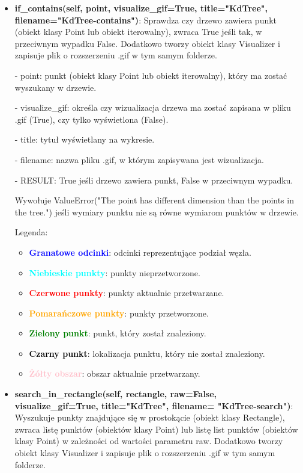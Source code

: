 \documentclass{lab}
\begin{document}
\begin{itemize}
  \item \textbf{if\_contains(self, point, visualize\_gif=True, title="KdTree", filename="KdTree-contains")}:
  Sprawdza czy drzewo zawiera punkt (obiekt klasy Point lub obiekt iterowalny), zwraca True jeśli tak, w przeciwnym wypadku False. Dodatkowo tworzy obiekt klasy Visualizer i zapisuje plik o rozszerzeniu .gif w tym samym folderze.

  - point: punkt (obiekt klasy Point lub obiekt iterowalny), który ma zostać wyszukany w drzewie.

  - visualize\_gif: określa czy wizualizacja drzewa ma zostać zapisana w pliku .gif (True), czy tylko wyświetlona (False).

  - title: tytuł wyświetlany na wykresie.

  - filename: nazwa pliku .gif, w którym zapisywana jest wizualizacja.

  - RESULT: True jeśli drzewo zawiera punkt, False w przeciwnym wypadku.

  Wywołuje ValueError("The point has different dimension than the points in the tree.") jeśli wymiary punktu nie są równe wymiarom punktów w drzewie.

  Legenda:
  \begin{itemize}
      \item \textbf{\textcolor{blue}{Granatowe odcinki}}: odcinki reprezentujące podział węzła.
      \item \textbf{\textcolor{cyan}{Niebieskie punkty}}: punkty nieprzetworzone.
      \item \textbf{\textcolor{red}{Czerwone punkty}}: punkty aktualnie przetwarzane.
      \item \textbf{\textcolor{orange}{Pomarańczowe punkty}}: punkty przetworzone.
      \item \textbf{\textcolor{green}{Zielony punkt}}: punkt, który został znaleziony.
      \item \textbf{\textcolor{black}{Czarny punkt}}: lokalizacja punktu, który nie został znaleziony.
      \item \textbf{\textcolor{pink}{Żółty obszar}}: obszar aktualnie przetwarzany.
  \end{itemize}

  \item \textbf{search\_in\_rectangle(self, rectangle, raw=False, visualize\_gif=True, title="KdTree", filename= "KdTree-search")}:
  Wyszukuje punkty znajdujące się w prostokącie (obiekt klasy Rectangle), zwraca listę punktów (obiektów klasy Point) lub listę list punktów (obiektów klasy Point) w zależności od wartości parametru raw. Dodatkowo tworzy obiekt klasy Visualizer i zapisuje plik o rozszerzeniu .gif w tym samym folderze.


\end{itemize}
\end{document}
